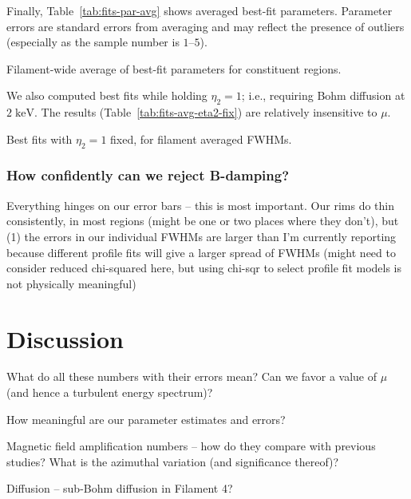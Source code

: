 \documentclass[12pt,preprint]{aastex}  %
\newcommand*{\mt}{\mathrm}
\newcommand*{\unit}[1]{\;\mt{#1}}  %
\begin{document}
Finally, Table~\ref{tab:fits-par-avg} shows averaged best-fit parameters.
Parameter errors are standard errors from averaging and may reflect the
presence of outliers (especially as the sample number is $1$--$5$).

\begin{table*}
\scriptsize
\centering
\caption{Filament-wide average of best-fit parameters for constituent regions.
\label{tab:fits-par-avg}}

\end{table*}

We also computed best fits while holding $\eta_2 = 1$; i.e., requiring Bohm
diffusion at $2 \unit{keV}$.  The results (Table~\ref{tab:fits-avg-eta2-fix})
are relatively insensitive to $\mu$.

\begin{table*}
\scriptsize
\centering
\caption{Best fits with $\eta_2 = 1$ fixed, for filament averaged FWHMs.
\label{tab:fits-avg-eta2-fix}}

\end{table*}

\subsubsection{How confidently can we reject B-damping?}

Everything hinges on our error bars -- this is most important.  Our rims do
thin consistently, in most regions (might be one or two places where they
don't), but (1) the errors in our individual FWHMs are larger than I'm
currently reporting because different profile fits will give a larger spread of
FWHMs (might need to consider reduced chi-squared here, but using chi-sqr to
select profile fit models is not physically meaningful)

\section{Discussion}

What do all these numbers with their errors mean?
Can we favor a value of $\mu$ (and hence a turbulent energy spectrum)?

How meaningful are our parameter estimates and errors?

Magnetic field amplification numbers -- how do they compare with previous
studies?  What is the azimuthal variation (and significance thereof)?

Diffusion -- sub-Bohm diffusion in Filament 4?
\end{document}
